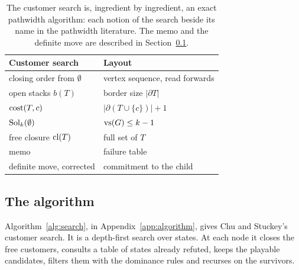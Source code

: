 \begin{table}[t]
\centering\small
\caption{The customer search is, ingredient by ingredient, an exact pathwidth
algorithm: each notion of the search beside its name in the pathwidth
literature. The memo and the definite move are described in
Section~\ref{sec:algorithm}.}
\label{tab:dictionary}
\begin{tabularx}{\linewidth}{@{}>{\raggedright}p{5.2cm}>{\raggedright\arraybackslash}X@{}}
\toprule
Customer search & Layout \\
\midrule
closing order from $\emptyset$ & vertex sequence, read forwards \\
open stacks $b(T)$ & border size $|\partial T|$ \\
$\mathrm{cost}(T,c)$ & $|\partial(T\cup\{c\})|+1$ \\
$\mathrm{Sol}_k(\emptyset)$ & $\mathrm{vs}(G)\le k-1$ \\
free closure $\mathrm{cl}(T)$ & full set of $T$ \citep[p.~328]{SuchanVillanger2009} \\
memo & failure table \\
definite move, corrected & commitment to the child \\
\bottomrule\end{tabularx}
\end{table}

\subsection{The algorithm}
\label{sec:algorithm}

Algorithm~\ref{alg:search}, in Appendix~\ref{app:algorithm}, gives Chu and
Stuckey's customer search. It is a depth-first
search over states. At each node it closes the free customers, consults a
table of states already refuted, keeps the playable candidates, filters them
with the dominance rules and recurses on the survivors.


